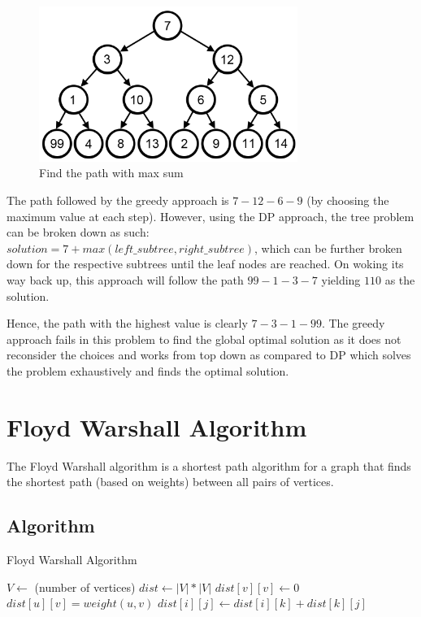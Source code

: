 \documentclass{article}
\begin{document}
\begin{figure}[H]
    \centering
    \includegraphics[width=0.75\textwidth]{greedy.png}
    \caption{Find the path with max sum}
    \label{fig:greedy}
\end{figure}
The path followed by the greedy approach is $7-12-6-9$ (by choosing the maximum value at each step).  However, using the DP approach, the tree problem can be broken down as such:\\
$solution = 7 + max(left\_subtree, right\_subtree)$, which can be further broken down for the respective subtrees until the leaf nodes are reached. On woking its way back up, this approach will follow the path $99-1-3-7$ yielding $110$ as the solution.

Hence, the path with the highest value is clearly $7-3-1-99$. The greedy approach fails in this problem to find the global optimal solution as it does not reconsider the choices and works from top down as compared to DP which solves the problem exhaustively and finds the optimal solution.

\section{Floyd Warshall Algorithm}
The Floyd Warshall algorithm is a shortest path algorithm for a graph that finds the shortest path (based on weights) between all pairs of vertices.
\subsection{Algorithm}
\begin{algorithm}
\label{algo:fwa}
\caption{Floyd Warshall Algorithm}
\begin{algorithmic}
\STATE $ V \leftarrow$ (number of vertices)
\STATE $dist \leftarrow |V|*|V|$
    \STATE $dist[v][v] \leftarrow 0$
\ENDFOR
{}
    \STATE $dist[u][v] = weight(u,v)$
\ENDFOR
{}
                \STATE $dist[i][j] \leftarrow dist[i][k] + dist[k][j]$
            \ENDIF
        \ENDFOR
    \ENDFOR
\ENDFOR
\end{algorithmic}
\end{algorithm}
\newpage
\end{document}
